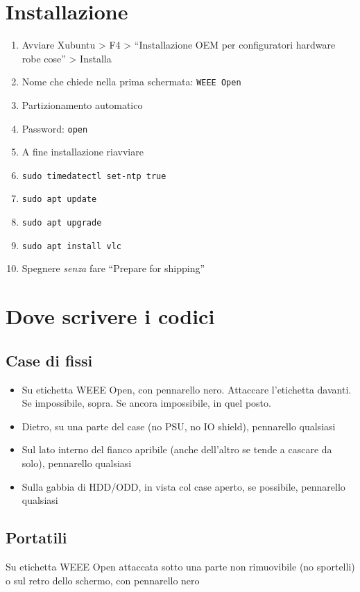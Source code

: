 \documentclass[a4paper,11pt,twoside]{article}
\begin{document}
\section{Installazione}
\begin{enumerate}
	\item Avviare Xubuntu > F4 > ``Installazione OEM per configuratori hardware robe cose'' > Installa
	\item Nome che chiede nella prima schermata: \texttt{WEEE Open}
	\item Partizionamento automatico
	\item Password: \texttt{open}
	\item A fine installazione riavviare
	\item \texttt{sudo timedatectl set-ntp true}
	\item \texttt{sudo apt update}
	\item \texttt{sudo apt upgrade}
	\item \texttt{sudo apt install vlc}
	\item Spegnere \emph{senza} fare ``Prepare for shipping''
\end{enumerate}

\section{Dove scrivere i codici}

\subsection{Case di fissi}
\begin{itemize}
	\item Su etichetta WEEE Open, con pennarello nero. Attaccare l'etichetta davanti. Se impossibile, sopra. Se ancora impossibile, in quel posto.
	\item Dietro, su una parte del case (no PSU, no IO shield), pennarello qualsiasi
	\item Sul lato interno del fianco apribile (anche dell'altro se tende a cascare da solo), pennarello qualsiasi
	\item Sulla gabbia di HDD/ODD, in vista col case aperto, se possibile, pennarello qualsiasi
\end{itemize}

\subsection{Portatili}
Su etichetta WEEE Open attaccata sotto una parte non rimuovibile (no sportelli) o sul retro dello schermo, con pennarello nero
\end{document}
